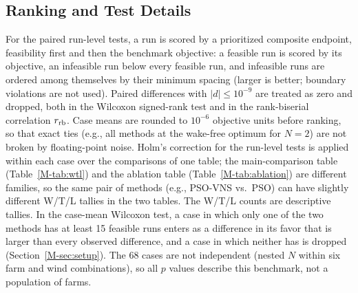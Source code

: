 \documentclass[10pt]{article}
\begin{document}
\subsection{Ranking and Test Details}
\label{sec:S-stats}
For the paired run-level tests, a run is scored by a prioritized composite endpoint, feasibility first and then the benchmark objective: a feasible run is scored by its objective, an infeasible run below every feasible run, and infeasible runs are ordered among themselves by their minimum spacing (larger is better; boundary violations are not used). Paired differences with $\lvert d\rvert\le10^{-9}$ are treated as zero and dropped, both in the Wilcoxon signed-rank test and in the rank-biserial correlation $r_{\rm rb}$. Case means are rounded to $10^{-6}$ objective units before ranking, so that exact ties (e.g., all methods at the wake-free optimum for $N=2$) are not broken by floating-point noise. Holm's correction for the run-level tests is applied within each case over the comparisons of one table; the main-comparison table (Table~\ref{M-tab:wtl}) and the ablation table (Table~\ref{M-tab:ablation}) are different families, so the same pair of methods (e.g., PSO-VNS vs.\ PSO) can have slightly different W/T/L tallies in the two tables. The W/T/L counts are descriptive tallies. In the case-mean Wilcoxon test, a case in which only one of the two methods has at least 15 feasible runs enters as a difference in its favor that is larger than every observed difference, and a case in which neither has is dropped (Section~\ref{M-sec:setup}). The 68 cases are not independent (nested $N$ within six farm and wind combinations), so all $p$ values describe this benchmark, not a population of farms.
\end{document}
